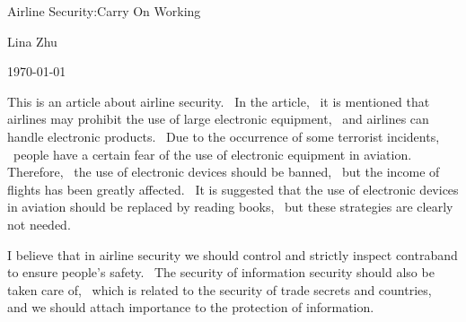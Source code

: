 \documentclass{article}
\begin{document}
	
	
	
	\begin{center}
		
		 Airline Security:Carry On Working
	\end{center}
	\begin{center}
	Lina Zhu
	\end{center}
	\begin{center}
		\today
	\end{center}
	
\par This is an article about airline security.~ In the article,~ it is mentioned that airlines may prohibit the use of large electronic equipment, ~and airlines can handle electronic products.~ Due to the occurrence of some terrorist incidents, ~people have a certain fear of the use of electronic equipment in aviation.~ Therefore, ~the use of electronic devices should be banned,~ but the income of flights has been greatly affected. ~It is suggested that the use of electronic devices in aviation should be replaced by reading books,~ but these strategies are clearly not needed.
\par I believe that in airline security we should control and strictly inspect contraband to ensure people's safety.~ The security of information security should also be taken care of, ~which is related to the security of trade secrets and countries,~ and we should attach importance to the protection of information.
\end{document}
